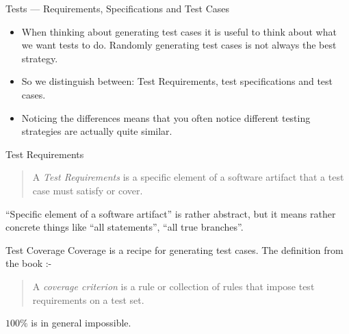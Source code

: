 \documentclass[handout]{beamer}
\begin{document}
\begin{frame}{Tests --- Requirements, Specifications and Test Cases}
  \begin{itemize}
  \item   When thinking about generating test cases it is useful to think
  about what we want tests to do. Randomly generating test cases is
  not always the best strategy.

\item   So we distinguish between: Test Requirements, test specifications
  and test cases.

\item   Noticing the differences means that you often notice different
  testing strategies are actually quite similar.
  \end{itemize}  
\end{frame}
\begin{frame}{Test Requirements}
  \begin{quote}
    A {\em Test Requirements}  is a specific element
    of a software artifact that a test case must satisfy or cover. 
  \end{quote}
``Specific element of a software artifact'' is rather abstract, but it
means rather concrete things like ``all statements'', ``all true
branches''.
\end{frame}
\begin{frame}{Test Coverage}
  Coverage is a recipe for generating test cases.  The definition from
  the book :-
  \begin{quote}
    A {\em coverage criterion} is a rule or collection of rules that
    impose test requirements on a test set.
  \end{quote}

  $100\%$ is in general impossible.
  
\end{frame}
\end{document}
